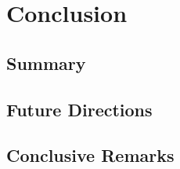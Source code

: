 \chapter{Conclusion}\label{ch:conclusion}

\section{Summary}

\section{Future Directions}

\section{Conclusive Remarks}